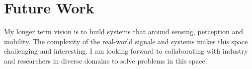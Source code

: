 \documentclass[10pt]{article}
\begin{document}


\section{Future Work}
My longer term vision is to build systems that 
around sensing, perception and mobility. The complexity of the real-world signals and systems makes this space challenging and interesting. I am looking forward to collaborating with industry and researchers in diverse domains to solve problems in this space. 

\end{document}
